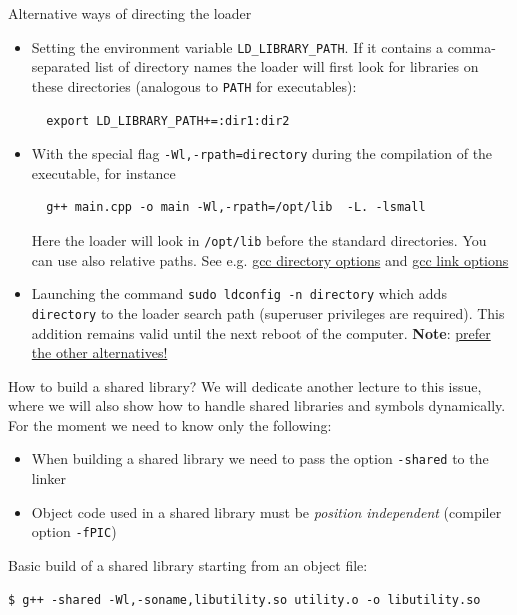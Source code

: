 \documentclass[10pt,aspectratio=169]{beamer}
\begin{document}
\begin{frame}[fragile]{Alternative ways of directing the loader}
  \begin{itemize}
  \item Setting the environment variable \texttt{LD\_LIBRARY\_PATH}. If
    it contains a comma-separated list of directory names the
    loader will first look for libraries on these directories (analogous to \texttt{PATH} for executables):
\begin{verbatim}
  export LD_LIBRARY_PATH+=:dir1:dir2
\end{verbatim}
\item With the special flag \texttt{-Wl,-rpath=directory}
  during the compilation of the executable, for instance
\begin{verbatim}
  g++ main.cpp -o main -Wl,-rpath=/opt/lib  -L. -lsmall
\end{verbatim}
Here the loader will look in \texttt{/opt/lib} before the standard directories. You can use also relative paths. See e.g. \href{https://gcc.gnu.org/onlinedocs/gcc/Directory-Options.html}{\color{blue}gcc directory options} and \href{https://gcc.gnu.org/onlinedocs/gcc/Link-Options.html}{\color{blue}gcc link options}
\item Launching the command \texttt{sudo ldconfig -n directory} which adds \texttt{directory} to the loader search path (superuser privileges are required). This addition remains valid until the next reboot of the computer. \textbf{Note}: \underline{prefer the other alternatives!}
  \end{itemize}
\end{frame}

\begin{frame}[fragile]{How to build a shared library?}
  We will dedicate another lecture to this issue, where we will also show how to handle shared libraries and symbols dynamically.
  For the moment we need to know only the following:
  \begin{itemize}
  \item When building a shared library we need to pass the option \texttt{-shared} to the linker
  \item Object code used in a shared library must be \emph{position independent} (compiler option \texttt{-fPIC})
  \end{itemize}

  Basic build of a shared library starting from an object file:
\begin{verbatim}
$ g++ -shared -Wl,-soname,libutility.so utility.o -o libutility.so
\end{verbatim}
\end{frame}
\end{document}
